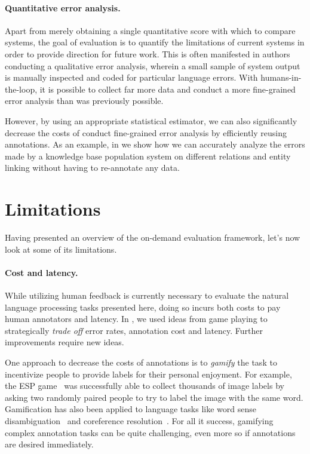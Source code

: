 \paragraph{Quantitative error analysis.}
Apart from merely obtaining a single quantitative score with which to compare systems, the goal of evaluation is to quantify the limitations of current systems in order to provide direction for future work.
This is often manifested in authors conducting a qualitative error analysis, wherein a small sample of system output is manually inspected and coded for particular language errors.
With humans-in-the-loop, it is possible to collect far more data and conduct a more fine-grained error analysis than was previously possible.

However, by using an appropriate statistical estimator, we can also significantly decrease the costs of conduct fine-grained error analysis by efficiently reusing annotations.
As an example, in  we show how we can accurately analyze the errors made by a knowledge base population system on different relations and entity linking without having to re-annotate any data.

\section{Limitations}
Having presented an overview of the on-demand evaluation framework, let's now look at some of its limitations.

\paragraph{Cost and latency.}
While utilizing human feedback is currently necessary to evaluate the natural language processing tasks presented here,
  doing so incurs both costs to pay human annotators and latency.
In , we used ideas from game playing to strategically \textit{trade off} error rates, annotation cost and latency. 
Further improvements require new ideas.

One approach to decrease the costs of annotations is to \textit{gamify} the task to incentivize people to provide labels for their personal enjoyment.
For example, the ESP game~\citep{espgame} was successfully able to collect thousands of image labels by asking two randomly paired people to try to label the image with the same word.
Gamification has also been applied to language tasks like word sense disambiguation~\citep{davidjurgens} and coreference resolution~\citep{phrasedetectives}.
For all it success, gamifying complex annotation tasks can be quite challenging, even more so if annotations are desired immediately.

